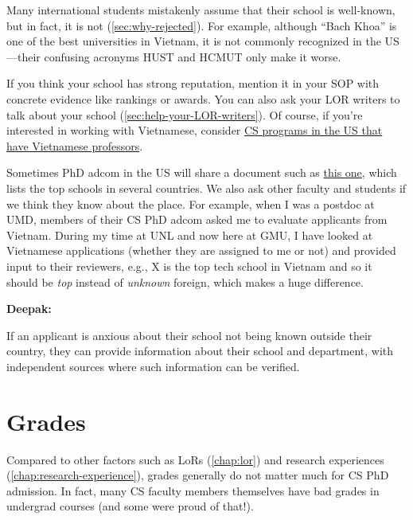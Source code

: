 \documentclass[oneside,11pt]{book}
\newenvironment{commentbox}[1][]{
  \small
  \begin{marker}[\faChessPawn{}]
    {\textbf{#1}}
  }{
  \end{marker}
}
\begin{document}
Many international students mistakenly assume that their school is well-known, but in fact, it is not (\autoref{sec:why-rejected}). For example, although ``Bach Khoa'' is one of the best universities in Vietnam, it is not commonly recognized in the US---their confusing acronyms HUST and HCMUT only make it worse.  

If you think your school has strong reputation, mention it in your SOP with concrete evidence like rankings or awards.  You can also ask your LOR writers to talk about your school (\autoref{sec:help-your-LOR-writers}).
Of course, if you're interested in working with Vietnamese, consider  \href{https://roars.dev/phd-cs-us/viet-cs-profs-us}{CS programs in the US that have Vietnamese professors}. %

\begin{commentbox}
  Sometimes PhD adcom in the US will share a document such as \href{https://github.com/dynaroars/dynaroars.github.io/wiki/Foreign-Top-Schools}{this one}, which lists the top schools in several countries. We also ask other faculty and students if we think they know about the place.  For example, when I was a postdoc at UMD, members of their CS PhD adcom asked me to evaluate applicants from Vietnam.  During my time at UNL and now here at GMU, I have looked at Vietnamese applications (whether they are assigned to me or not) and provided input to their reviewers, e.g., X is the top tech school in Vietnam and so it should be \emph{top} instead of \emph{unknown} foreign, which makes a huge difference.
\end{commentbox}
\begin{commentbox}[Deepak:]
  If an applicant is anxious about their school not being known outside their country, they can provide information about their school and department, with independent sources where such information can be verified.
\end{commentbox}
\section{Grades}\label{sec:gpa}

Compared to other factors such as LoRs (\autoref{chap:lor}) and research experiences (\autoref{chap:research-experience}), grades generally do not matter much for CS PhD admission.  
In fact, many CS faculty members themselves have bad grades in undergrad courses (and some were proud of that!).
\end{document}
